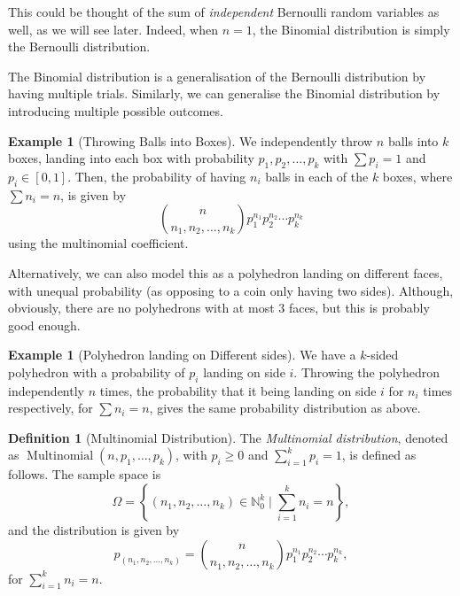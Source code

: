 \documentclass[11pt]{article}
\numberwithin{equation}{section}
\theoremstyle{definition}
\newtheorem{definition}[theorem]{Definition}
\newtheorem{example}[theorem]{Example}
\theoremstyle{remark}
\newcommand{\pqty}[1]{\left(#1\right)}
\newcommand{\set}[2]{\left\{#1\mid #2\right\}}
\newcommand{\ccintv}[2]{[#1,#2]}
\newcommand{\NN}{\mathbb N}
\newcommand{\Multinomial}{\operatorname{Multinomial}}
\begin{document}
This could be thought of the sum of \emph{independent} Bernoulli random variables as well, as we will see later. Indeed, when \(n = 1\), the Binomial distribution is simply the Bernoulli distribution.

The Binomial distribution is a generalisation of the Bernoulli distribution by having multiple trials. Similarly, we can generalise the Binomial distribution by introducing multiple possible outcomes.

\begin{example}[Throwing Balls into Boxes]\label{probability-example-015}
    \label{probability-ex:throwing-balls-into-boxes}%
    We independently throw \(n\) balls into \(k\) boxes, landing into each box with probability \(p_1, p_2, \ldots, p_k\) with \(\sum p_i = 1\) and \(p_i \in \ccintv{0}{1}\). Then, the probability of having \(n_i\) balls in each of the \(k\) boxes, where \(\sum n_i = n\), is given by
    \[
        \binom{n}{n_1, n_2, \ldots, n_k} p_1^{n_1} p_2^{n_2} \cdots p_k^{n_k}
    \]
    using the multinomial coefficient.
\end{example}

Alternatively, we can also model this as a polyhedron landing on different faces, with unequal probability (as opposing to a coin only having two sides). Although, obviously, there are no polyhedrons with at most 3 faces, but this is probably good enough.

\begin{example}[Polyhedron landing on Different sides]\label{probability-example-016}
    \label{probability-ex:polyhedron-different-sides}%
    We have a \(k\)-sided polyhedron with a probability of \(p_i\) landing on side \(i\). Throwing the polyhedron independently \(n\) times, the probability that it being landing on side \(i\) for \(n_i\) times respectively, for \(\sum n_i = n\), gives the same probability distribution as above.
\end{example}

\begin{definition}[Multinomial Distribution]\label{probability-definition-013}
    \label{probability-def:multinomial-distribution}%
    The \emph{Multinomial distribution}, denoted as \(\Multinomial\pqty{n, p_1, \ldots, p_k}\), with \(p_i \geq 0\) and \(\sum_{i = 1}^{k} p_i = 1\), is defined as follows. The sample space is
    \[
        \Omega = \set{\pqty{n_1, n_2, \ldots, n_k} \in \NN_0^k}{\sum_{i = 1}^{k} n_i = n},
    \]
    and the distribution is given by
    \[
        p_{\pqty{n_1, n_2, \ldots, n_k}} = \binom{n}{n_1, n_2, \ldots, n_k} p_1^{n_1} p_2^{n_2} \cdots p_k^{n_k},
    \]
    for \(\sum_{i = 1}^{k} n_i = n\).
\end{definition}
\end{document}
